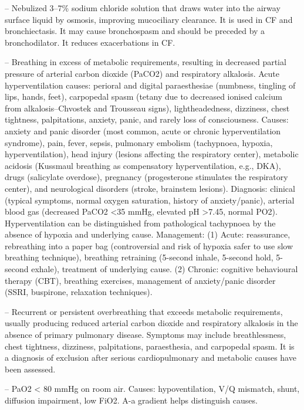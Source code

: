 -- Nebulized 3--7\% sodium chloride solution that draws water into the airway surface liquid by osmosis, improving mucociliary clearance. It is used in CF and bronchiectasis. It may cause bronchospasm and should be preceded by a bronchodilator. It reduces exacerbations in CF.

-- Breathing in excess of metabolic requirements, resulting in decreased partial pressure of arterial carbon dioxide (PaCO2) and respiratory alkalosis. Acute hyperventilation causes: perioral and digital paraesthesiae (numbness, tingling of lips, hands, feet), carpopedal spasm (tetany due to decreased ionised calcium from alkalosis--Chvostek and Trousseau signs), lightheadedness, dizziness, chest tightness, palpitations, anxiety, panic, and rarely loss of consciousness. Causes: anxiety and panic disorder (most common, acute or chronic hyperventilation syndrome), pain, fever, sepsis, pulmonary embolism (tachypnoea, hypoxia, hyperventilation), head injury (lesions affecting the respiratory center), metabolic acidosis (Kussmaul breathing as compensatory hyperventilation, e.g., DKA), drugs (salicylate overdose), pregnancy (progesterone stimulates the respiratory center), and neurological disorders (stroke, brainstem lesions). Diagnosis: clinical (typical symptoms, normal oxygen saturation, history of anxiety/panic), arterial blood gas (decreased PaCO2 <35 mmHg, elevated pH >7.45, normal PO2). Hyperventilation can be distinguished from pathological tachypnoea by the absence of hypoxia and underlying cause. Management: (1) Acute: reassurance, rebreathing into a paper bag (controversial and risk of hypoxia safer to use slow breathing technique), breathing retraining (5-second inhale, 5-second hold, 5-second exhale), treatment of underlying cause. (2) Chronic: cognitive behavioural therapy (CBT), breathing exercises, management of anxiety/panic disorder (SSRI, buspirone, relaxation techniques).

-- Recurrent or persistent overbreathing that exceeds metabolic requirements, usually producing reduced arterial carbon dioxide and respiratory alkalosis in the absence of primary pulmonary disease. Symptoms may include breathlessness, chest tightness, dizziness, palpitations, paraesthesia, and carpopedal spasm. It is a diagnosis of exclusion after serious cardiopulmonary and metabolic causes have been assessed.

-- PaO2 < 80 mmHg on room air. Causes: hypoventilation, V/Q mismatch, shunt, diffusion impairment, low FiO2. A-a gradient helps distinguish causes.

